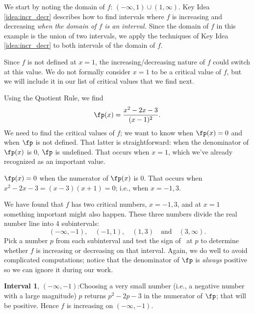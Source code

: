 {We start by noting the domain of $f$: $(-\infty,1)\cup(1,\infty)$. Key Idea \ref{idea:incr_decr} describes how to find intervals where $f$ is increasing and decreasing \textit{when the domain of $f$ is an interval.} Since the domain of $f$ in this example is the union of two intervals, we apply the techniques of Key Idea \ref{idea:incr_decr} to both intervals of the domain of $f$. 

Since $f$ is not defined at $x=1$, the increasing/decreasing nature of $f$ could switch at this value. We do not formally consider $x=1$ to be a critical value of $f$, but we will include it in our list of critical values that we find next.

Using the Quotient Rule, we find
$$\fp(x) = \frac{x^2-2x-3}{(x-1)^2}.$$
We need to find the critical values of $f$; we want to know when $\fp(x)=0$ and when $\fp$ is not defined. That latter is straightforward: when the denominator of $\fp(x)$ is 0, $\fp$ is undefined. That occurs when $x=1$, which we've already recognized as an important value.


$\fp(x)=0$ when the numerator of $\fp(x)$ is 0. That occurs when $x^2-2x-3 = (x-3)(x+1) = 0$; i.e., when $x=-1,3$. 

We have found that $f$ has two critical numbers, $x=-1,3$, and at $x=1$ something important might also happen. These three numbers divide the real number line into 4 subintervals: $$(-\infty,-1), \quad (-1, 1), \quad (1,3) \quad \text{and} \quad (3,\infty).$$ Pick a number $p$ from each subinterval and test the sign of \fp\ at $p$ to determine whether $f$ is increasing or decreasing on that interval. Again, we do well to avoid complicated computations; notice that the denominator of $\fp$ is \textit{always} positive so we can ignore it during our work.

\noindent\textbf{Interval 1}, $(-\infty,-1)$:\quad  Choosing a very small number (i.e., a negative number with a large magnitude) $p$ returns $p^2-2p-3$ in the numerator of $\fp$; that will be positive. Hence $f$ is increasing on $(-\infty,-1)$.

}
